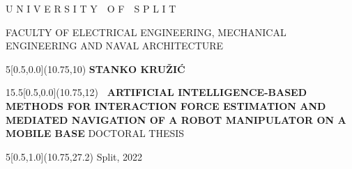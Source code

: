 \documentclass[12pt, twoside, onecolumn]{book}
\DeclareRobustCommand{\[}{\begin{equation}}
\DeclareRobustCommand{\]}{\end{equation}}
\begin{document}
\frontmatter \pagestyle{plain}


\begin{titlepage}
\begin{center}
{\fontsize{13}{20}\textnormal{U N I V E R S I T Y~~O F~~S P L I T}}

{\fontsize{13}{20}\textnormal{FACULTY OF ELECTRICAL ENGINEERING, MECHANICAL ENGINEERING AND NAVAL ARCHITECTURE}}
\vskip 60mm
\begin{textblock}{5}[0.5,0.0](10.75,10) \fontsize{14}{20}\bfseries{STANKO KRUŽIĆ} \end{textblock}
\begin{textblock}{15.5}[0.5,0.0](10.75,12)
{\fontsize{18}{26}\bfseries\
ARTIFICIAL INTELLIGENCE-BASED METHODS FOR INTERACTION FORCE ESTIMATION AND MEDIATED NAVIGATION OF A ROBOT MANIPULATOR ON A MOBILE BASE}
\vskip 20mm
{\fontsize{14}{20}\textnormal{DOCTORAL THESIS}}
\end{textblock}
\begin{textblock}{5}[0.5,1.0](10.75,27.2)
{\fontsize{13}{20}\textnormal
Split, 2022}
\end{textblock}
\newpage
\thispagestyle{empty}
\end{center}
\end{titlepage}

\end{document}
